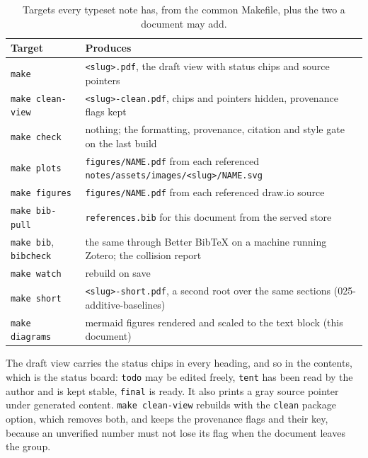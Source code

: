 \begin{table}[htbp]
\centering
\footnotesize
\caption{Targets every typeset note has, from the common Makefile, plus the two a
document may add.}
\label{tab:notetargets}
\begin{tabular}{lp{}}
\toprule
Target & Produces \\
\midrule
\texttt{make} & \texttt{<slug>.pdf}, the draft view with status chips and source pointers \\
\texttt{make clean-view} & \texttt{<slug>-clean.pdf}, chips and pointers hidden, provenance flags kept \\
\texttt{make check} & nothing; the formatting, provenance, citation and style gate on the last build \\
\texttt{make plots} & \texttt{figures/{}NAME.pdf} from each referenced \texttt{notes/assets/images/<slug>/NAME.svg} \\
\texttt{make figures} & \texttt{figures/{}NAME.pdf} from each referenced draw.io source \\
\texttt{make bib-pull} & \texttt{references.bib} for this document from the served store \\
\texttt{make bib}, \texttt{bibcheck} & the same through Better BibTeX on a machine running Zotero; the collision report \\
\texttt{make watch} & rebuild on save \\
\midrule
\texttt{make short} & \texttt{<slug>-short.pdf}, a second root over the same sections (025-additive-baselines) \\
\texttt{make diagrams} & mermaid figures rendered and scaled to the text block (this document) \\
\bottomrule
\end{tabular}
\end{table}

The draft view carries the status chips in every heading, and so in the contents,
which is the status board: \texttt{todo} may be edited freely, \texttt{tent} has
been read by the author and is kept stable, \texttt{final} is ready. It also
prints a gray source pointer under generated content. \texttt{make clean-view}
rebuilds with the \texttt{clean} package option, which removes both, and keeps the
provenance flags and their key, because an unverified number must not lose its
flag when the document leaves the group.

